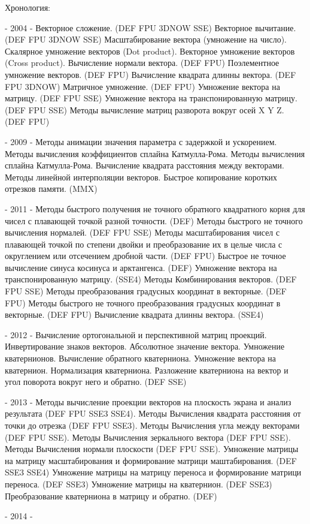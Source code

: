 Хронология\-: \begin{DoxyVerb}- 2004 -
Векторное сложение. (DEF FPU 3DNOW SSE)
Векторное вычитание. (DEF  FPU 3DNOW SSE)
Масштабирование вектора (умножение на число).
Скалярное умножение векторов (Dot product).
Векторное умножение векторов (Cross product).
Вычисление нормали вектора. (DEF FPU)
Поэлементное умножение векторов. (DEF FPU)
Вычисление квадрата длинны вектора. (DEF FPU 3DNOW)
Матричное умножение. (DEF FPU)
Умножение вектора на матрицу. (DEF FPU SSE)
Умножение вектора на транспонированную матрицу. (DEF FPU SSE)
Методы вычисление матриц разворота вокруг осей X Y Z. (DEF FPU)

- 2009 -
Методы анимации значения параметра с задержкой и ускорением.
Методы вычисления коэффициентов сплайна Катмулла-Рома.
Методы вычисления сплайна Катмулла-Рома.
Вычисление квадрата расстояния между векторами.
Методы линейной интерполяции векторов.
Быстрое копирование коротких отрезков памяти. (MMX)

- 2011 -
Методы быстрого получения не точного обратного квадратного корня для чисел с плавающей точкой разной точности. (DEF)
Методы быстрого не точного вычисления нормалей. (DEF FPU SSE)
Методы масштабирования чисел с плавающей точкой по степени двойки и преобразование их в целые числа с округлением или отсечением дробной части. (DEF FPU)
Быстрое не точное вычисление синуса косинуса и арктангенса. (DEF)
Умножение вектора на транспонированную матрицу. (SSE4)
Методы Комбинирования векторов. (DEF FPU SSE)
Методы преобразования градусных координат в векторные.  (DEF FPU)
Методы быстрого не точного преобразования градусных координат в векторные.  (DEF FPU)
Вычисление квадрата длинны вектора. (SSE4)

- 2012 -
Вычисление ортогональной и перспективной матриц проекций.
Инвертирование знаков векторов.
Абсолютное значение вектора.
Умножение кватернионов.
Вычисление обратного кватерниона.
Умножение вектора на кватернион.
Нормализация кватерниона.
Разложение кватерниона на вектор и угол поворота вокруг него и обратно. (DEF SSE)

- 2013 -
Методы вычисление проекции векторов на плоскость экрана и анализ результата (DEF FPU SSE3 SSE4).
Методы Вычисления квадрата расстояния от точки до отрезка (DEF FPU SSE3).
Методы Вычисления угла между векторами (DEF FPU SSE).
Методы Вычисления зеркального вектора (DEF FPU SSE).
Методы Вычисления нормали плоскости (DEF FPU SSE).
Умножение матрицы на матрицу масштабирования и формирование матрици маштабирования. (DEF SSE3 SSE4)
Умножение матрицы на матрицу переноса и формирование матрици переноса. (DEF SSE3)
Умножение матрицы на кватернион. (DEF SSE3)
Преобразование кватерниона в матрицу и обратно. (DEF)

- 2014 -\end{DoxyVerb}


